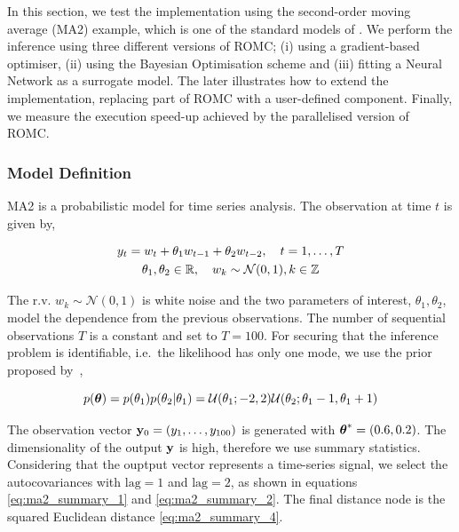 In this section, we test the implementation using the second-order
moving average (MA2) example, which is one of the standard models of
. We perform the inference using three different versions of
ROMC; (i) using a gradient-based optimiser, (ii) using the Bayesian
Optimisation scheme and (iii) fitting a Neural Network as a surrogate
model. The later illustrates how to extend the implementation,
replacing part of ROMC with a user-defined component. Finally, we
measure the execution speed-up achieved by the parallelised version of
ROMC.

\subsubsection*{Model Definition}

MA2 is a probabilistic model for time series analysis. The observation
at time \(t\) is given by,

\begin{gather} \label{eq:ma2}
y_t = w_t + \theta_1 w_{t-1} + \theta_2 w_{t-2}, \quad t=1, \ldots, T\\
\theta_1, \theta_2 \in \mathbb{R}, \quad  w_k \sim \mathcal{N}(0,1), k \in \mathbb{Z}
\end{gather}

\noindent
The r.v. \(w_{k} \sim \mathcal{N}(0,1) \) is white noise and the two
parameters of interest, \(\theta_1, \theta_2\), model the dependence
from the previous observations. The number of sequential observations
\(T\) is a constant and set to \(T=100\). For securing
that the inference problem is identifiable, i.e.\ the likelihood has
only one mode, we use the prior proposed by~\cite{Marin2012},

\begin{equation} \label{eq:ma2_prior}
p(\boldsymbol{\theta}) = p(\theta_1)p(\theta_2|\theta_1)
= \mathcal{U}(\theta_1;-2,2)\mathcal{U}(\theta_2;\theta_1-1, \theta_1+1)
\end{equation}


\noindent
The observation vector \(\mathbf{y}_0 = (y_1, \ldots, y_{100})\) is generated
with \(\boldsymbol{\theta}^*=(0.6, 0.2)\). The dimensionality of the output
\(\mathbf{y}\) is high, therefore we use summary statistics. Considering that
the ouptput vector represents a time-series signal, we select the
autocovariances with \(\mathrm{lag}=1\) and \(\mathrm{lag}=2\), as shown in equations
\eqref{eq:ma2_summary_1} and \eqref{eq:ma2_summary_2}. The final
distance node is the squared Euclidean distance
\eqref{eq:ma2_summary_4}.


